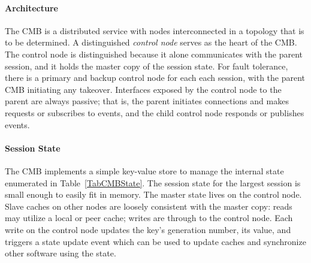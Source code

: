 \paragraph{Architecture}
The CMB is a distributed service with nodes interconnected in a topology
that is to be determined.
A distinguished {\em control node} serves as the heart of the CMB.
The control node is distinguished because it alone communicates with
the parent session, and it holds the master copy of the session state.
For fault tolerance, there is a primary and backup control node for each
each session, with the parent CMB initiating any takeover.
Interfaces exposed by the control node to the parent are always passive;
that is, the parent initiates connections and makes requests or subscribes
to events, and the child control node responds or publishes events.

\paragraph{Session State}
The CMB implements a simple key-value store to manage the
internal state enumerated in Table~\ref{TabCMBState}.
The session state for the largest session is small enough to easily
fit in memory.
The master state lives on the control node.
Slave caches on other nodes are loosely consistent with the master copy:
reads may utilize a local or peer cache;
writes are through to the control node.
Each write on the control node updates the key's generation number,
its value, and triggers a state update event which
can be used to update caches and synchronize other software using the
state.

